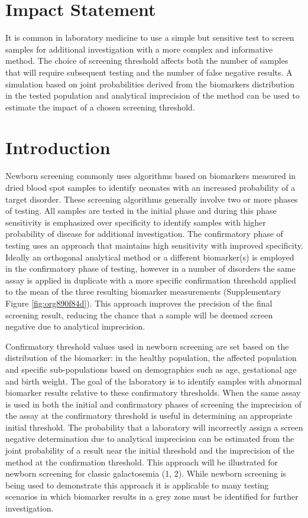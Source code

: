 \documentclass[review]{elsarticle}
\makeatletter
\newcommand{\citeprocitem}[2]{\hyper@linkstart{cite}{citeproc_bib_item_#1}#2\hyper@linkend}
\makeatother
\begin{document}
\section*{Impact Statement}
\label{sec:org8bfaad6}
It is common in laboratory medicine to use a simple but sensitive
test to screen samples for additional investigation with a more
complex and informative method. The choice of screening threshold
affects both the number of samples that will require subsequent
testing and the number of false negative results. A simulation based
on joint probabilities derived from the biomarkers distribution in
the tested population and analytical imprecision of the method can
be used to estimate the impact of a chosen screening threshold.

\section*{Introduction}
\label{sec:org301467b}
Newborn screening commonly uses algorithms based on biomarkers
measured in dried blood spot samples to identify neonates with an
increased probability of a target disorder. These screening algorithms
generally involve two or more phases of testing. All samples are
tested in the initial phase and during this phase sensitivity is
emphasized over specificity to identify samples with higher
probability of disease for additional investigation. The confirmatory
phase of testing uses an approach that maintains high sensitivity
with improved specificity. Ideally an orthogonal analytical method or
a different biomarker(s) is employed in the confirmatory phase of
testing, however in a number of disorders the same assay is applied in
duplicate with a more specific confirmation threshold applied to the
mean of the three resulting biomarker measurements (Supplementary Figure
\ref{fig:org890f84d}). This approach improves the precision of the final
screening result, reducing the chance that a sample will be deemed
screen negative due to analytical imprecision.

Confirmatory threshold values used in newborn screening are set based
on the distribution of the biomarker: in the healthy population, the
affected population and specific sub-populations based on demographics
such as age, gestational age and birth weight. The goal of the
laboratory is to identify samples with abnormal biomarker results
relative to these confirmatory thresholds. When the same assay is used
in both the initial and confirmatory phases of screening the
imprecision of the assay at the confirmatory threshold is useful in
determining an appropriate initial threshold. The probability that a
laboratory will incorrectly assign a screen negative determination due
to analytical imprecision can be estimated from the joint probability
of a result near the initial threshold and the imprecision of the
method at the confirmation threshold. This approach will be
illustrated for newborn screening for classic galactosemia
(\citeprocitem{1}{1}, \citeprocitem{2}{2}). While newborn screening is being
used to demonstrate this approach it is applicable to many testing
scenarios in which biomarker results in a grey zone must be identified
for further investigation.
\end{document}
